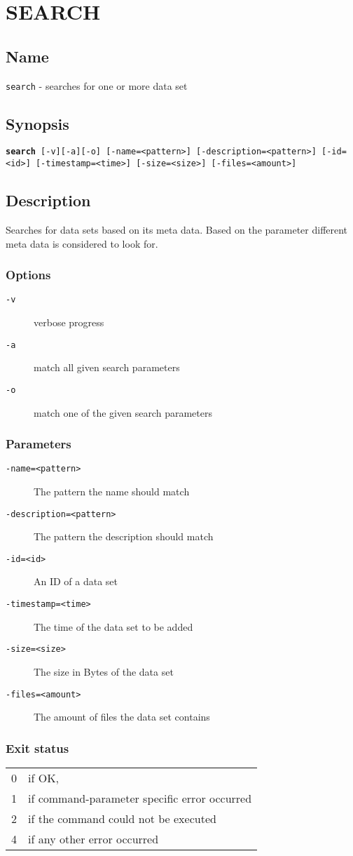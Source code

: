 \documentclass{article} %
\begin{document}
		\section*{SEARCH}
		\subsection*{Name}
		\texttt{search} - searches for one or more data set
		\subsection*{Synopsis}
		\texttt{\textbf{search} [-v][-a][-o] [-name=<pattern>] [-description=<pattern>] [-id=<id>] [-timestamp=<time>] [-size=<size>] [-files=<amount>]}
		\subsection*{Description}
		Searches for data sets based on its meta data. Based on the parameter different meta data is considered to look for.\\
		
		\noindent
		\subsubsection*{Options}
		\begin{description}
			\item[\texttt{-v}] verbose progress
			\item[\texttt{-a}] match all given search parameters
			\item[\texttt{-o}] match one of the given search parameters
		\end{description}
		
		\subsubsection*{Parameters}
		\begin{description}
			\item[\texttt{-name=<pattern>}] The pattern the name should match
			\item[\texttt{-description=<pattern>}] The pattern the description should match
			\item[\texttt{-id=<id>}] An ID of a data set
			\item[\texttt{-timestamp=<time>}] The time of the data set to be added
			\item[\texttt{-size=<size>}] The size in Bytes of the data set
			\item[\texttt{-files=<amount>}] The amount of files the data set contains
		\end{description}
		\subsubsection*{Exit status}
		\begin{tabular}{ll}
			0 &  if OK,\\ 
			1 &  if command-parameter specific error occurred\\
			2 &  if the command could not be executed\\
			4 &  if any other error occurred\\
		\end{tabular}
		\newpage
\end{document}
